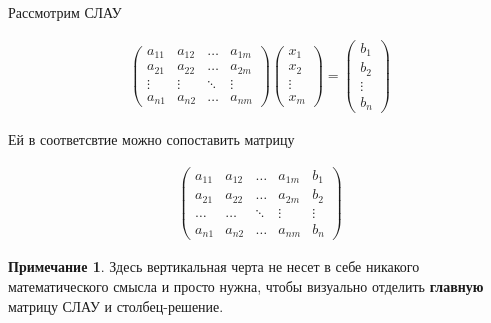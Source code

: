 \documentclass[]{article}
\theoremstyle{theorem}
\theoremstyle{definition}
\newtheorem*{nt}{Примечание}
\begin{document}
Рассмотрим СЛАУ

\begin{gather*}
	\begin{pmatrix}
		a_{11} & a_{12} & \ldots & a_{1m}
		\\
		a_{21} & a_{22} & \ldots & a_{2m}
		\\
		\vdots & \vdots & \ddots & \vdots
		\\
		a_{n1} & a_{n2} & \ldots & a_{nm}
	\end{pmatrix}
	\begin{pmatrix}
		x_{1}
		\\
		x_{2}
		\\
		\vdots
		\\
		x_{m}
	\end{pmatrix}
	=
	\begin{pmatrix}
		b_1
		\\
		b_2
		\\
		\vdots
		\\
		b_n
	\end{pmatrix}
\end{gather*}

Ей в соответсвтие можно сопоставить матрицу

\begin{gather*}
	\left(
	\begin{array}{llll|l}
		a_{11} & a_{12} & \ldots & a_{1m} & b_{1}
		\\
		a_{21} & a_{22} & \ldots & a_{2m} & b_{2} 
		\\
		\ldots & \ldots & \ddots & \vdots & \vdots
		\\
		a_{n1} & a_{n2} & \ldots & a_{nm} & b_{n}
	\end{array}
	\right)
\end{gather*}

\begin{nt}
	Здесь вертикальная черта не несет в себе никакого математического смысла и просто нужна, чтобы визуально отделить \textbf{главную} матрицу СЛАУ и столбец-решение.
\end{nt}
\end{document}
